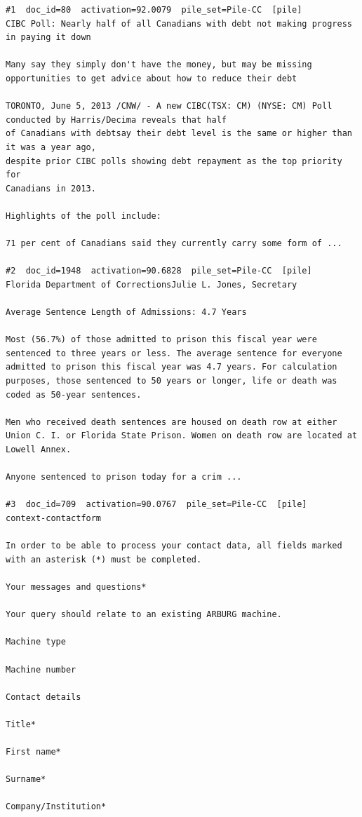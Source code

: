 \begin{verbatim}
#1  doc_id=80  activation=92.0079  pile_set=Pile-CC  [pile]
CIBC Poll: Nearly half of all Canadians with debt not making progress in paying it down

Many say they simply don't have the money, but may be missing
opportunities to get advice about how to reduce their debt

TORONTO, June 5, 2013 /CNW/ - A new CIBC(TSX: CM) (NYSE: CM) Poll conducted by Harris/Decima reveals that half
of Canadians with debtsay their debt level is the same or higher than it was a year ago,
despite prior CIBC polls showing debt repayment as the top priority for
Canadians in 2013.

Highlights of the poll include:

71 per cent of Canadians said they currently carry some form of ...

#2  doc_id=1948  activation=90.6828  pile_set=Pile-CC  [pile]
Florida Department of CorrectionsJulie L. Jones, Secretary

Average Sentence Length of Admissions: 4.7 Years

Most (56.7%) of those admitted to prison this fiscal year were sentenced to three years or less. The average sentence for everyone admitted to prison this fiscal year was 4.7 years. For calculation purposes, those sentenced to 50 years or longer, life or death was coded as 50-year sentences.

Men who received death sentences are housed on death row at either Union C. I. or Florida State Prison. Women on death row are located at Lowell Annex.

Anyone sentenced to prison today for a crim ...

#3  doc_id=709  activation=90.0767  pile_set=Pile-CC  [pile]
context-contactform

In order to be able to process your contact data, all fields marked with an asterisk (*) must be completed.

Your messages and questions*

Your query should relate to an existing ARBURG machine.

Machine type

Machine number

Contact details

Title*

First name*

Surname*

Company/Institution*


\end{verbatim}
